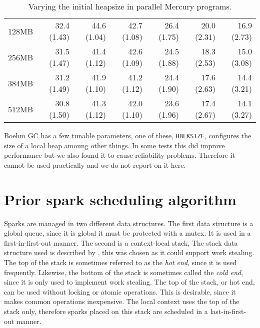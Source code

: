 \begin{table}
\begin{center}
\begin{tabular}{r|rr|rrrr}
128MB  & 32.4 (1.43) & 44.6 (1.04) & 42.7 (1.08) & 26.4 (1.75) & 20.0 (2.31) & 16.9 (2.73) \\
256MB  & 31.5 (1.47) & 41.4 (1.12) & 42.6 (1.09) & 24.5 (1.88) & 18.3 (2.53) & 15.0 (3.08) \\
384MB  & 31.2 (1.49) & 41.9 (1.10) & 41.2 (1.12) & 24.4 (1.90) & 17.6 (2.63) & 14.4 (3.21) \\
512MB  & 30.8 (1.50) & 41.3 (1.12) & 42.0 (1.10) & 23.6 (1.96) & 17.4 (2.67) & 14.1 (3.27) \\
\end{tabular}
\end{center}
\caption{Varying the initial heapsize in parallel Mercury programs.}
\label{tab:heapsize}
\end{table}



Boehm GC has a few tunable parameters, one of these, \texttt{HBLKSIZE},
configures the size of a local heap amoung other things.
In some tests this did improve performance but we also found it to cause
reliability problems.
Therefore it cannot be used practically and we do not report on it here.


\section{Prior spark scheduling algorithm}
\label{sec:old_scheduling}


Sparks are managed in two different data structures.
The first data structure is a global queue,
since it is global it must be protected with a mutex.
It is used in a first-in-first-out manner.
The second is a context-local stack,
The stack data structure used is described by \citet{workstealing_queue},
this was chosen as it could support work stealing.
The top of the stack is sometimes referred to as the \emph{hot end},
since it is used frequently.
Likewise, the bottom of the stack is sometimes called the
\emph{cold end}, since it is only used to implement work stealing.
The top of the stack, or hot end, can be used without locking or atomic
operations.
This is desirable, since it makes common operations inexpensive.
The local context uses the top of the stack only,
therefore sparks placed on this stack are scheduled in a
last-in-first-out manner.


